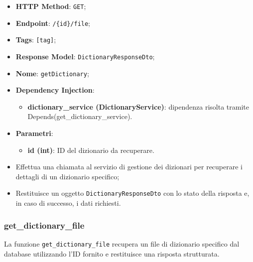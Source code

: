 \begin{itemize}
  \item \textbf{HTTP Method}: \texttt{GET};
  \item \textbf{Endpoint}: \texttt{/\{id\}/file};
  \item \textbf{Tags}: \texttt{[tag]};
  \item \textbf{Response Model}: \texttt{DictionaryResponseDto};
  \item \textbf{Nome}: \texttt{getDictionary};
  \item \textbf{Dependency Injection}:
  \begin{itemize}
    \item \textbf{dictionary\_service (DictionaryService)}: dipendenza risolta tramite Depends(get\_dictionary\_service).
  \end{itemize}
  \item \textbf{Parametri}:
  \begin{itemize}
    \item \textbf{id (int)}: ID del dizionario da recuperare.
  \end{itemize}
\end{itemize}

\begin{itemize}
  \item Effettua una chiamata al servizio di gestione dei dizionari per recuperare i dettagli di un dizionario specifico;
  \item Restituisce un oggetto \texttt{DictionaryResponseDto} con lo stato della risposta e, in caso di successo, i dati richiesti.
\end{itemize}

\subsubsection{get\_dictionary\_file}

\par La funzione \texttt{get\_dictionary\_file} recupera un file di dizionario specifico dal database utilizzando l'ID fornito e restituisce una risposta strutturata.

